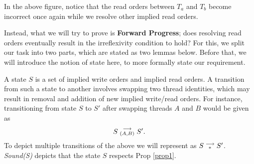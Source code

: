         In the above figure, notice that the read orders between $T_a$ and $T_b$ become incorrect once again while we resolve other implied read orders.
        


        Instead, what we will try to prove is \textbf{Forward Progress}; does resolving read orders eventually result in the irreflexivity condition to hold? 
        For this, we split our task into two parts, which are stated as two lemmas below. 
        Before that, we will introduce the notion of state here, to more formally state our requirement. 
        
        A state $S$ is a set of implied write orders and implied read orders.
        A transition from such a state to another involves swapping two thread identities, which may result in removal and addition of new implied write/read orders.
        For instance, transitioning from state $S$ to $S'$ after swapping threads $A$ and $B$ would be given as 
        \begin{align*}
            S\stackrel{\longrightarrow}{_{(A,B)}}S'.
        \end{align*}
        To depict multiple transitions of the above we will represent as $S\stackrel{\longrightarrow}{_{*}}S'$.
        \textit{Sound(S)}  depicts that the state $S$ respects Prop \ref{prop1}.
        
        

